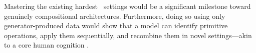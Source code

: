 Mastering the existing hardest \generatorName\ settings would be a significant milestone toward genuinely compositional architectures.
Furthermore, doing so using only generator-produced data would show that a model can identify primitive operations, apply them sequentially, and recombine them in novel settings---akin to a core human cognition \cite{fodor1988connectionism}.

%





